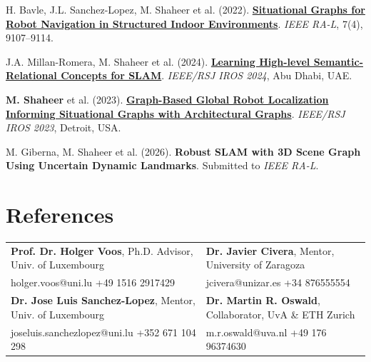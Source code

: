 \documentclass[a4paper,11pt]{article}
\begin{document}
{\begin{enumerate}[leftmargin=*, labelsep=0.5em, align=left, widest={[\textbf{S.1}]}, itemindent=0em, itemsep=0mm]
\item[\textbf{[J.8]}] H. Bavle, J.L. Sanchez-Lopez, M. Shaheer et al. (2022). \href{https://ieeexplore.ieee.org/document/9826367}{\textbf{Situational Graphs for Robot Navigation in Structured Indoor Environments}}. \textit{IEEE RA-L}, 7(4), 9107--9114.

\item[\textbf{[C.1]}] J.A. Millan-Romera, M. Shaheer et al. (2024). \href{https://ieeexplore.ieee.org/document/10801511}{\textbf{Learning High-level Semantic-Relational Concepts for SLAM}}. \textit{IEEE/RSJ IROS 2024}, Abu Dhabi, UAE.

\item[\textbf{[C.2]}] \textbf{M. Shaheer} et al. (2023). \href{https://ieeexplore.ieee.org/document/10341373}{\textbf{Graph-Based Global Robot Localization Informing Situational Graphs with Architectural Graphs}}. \textit{IEEE/RSJ IROS 2023}, Detroit, USA.

\item[\textbf{[S.1]}] M. Giberna, M. Shaheer et al. (2026). \textbf{Robust SLAM with 3D Scene Graph Using Uncertain Dynamic Landmarks}. Submitted to \textit{IEEE RA-L}.
\end{enumerate}
}
\vspace{-2mm}

\section{\textbf{References}}
\vspace{1mm}
\footnotesize{
\begin{tabularx}{\textwidth}{@{}L@{\hspace{5mm}}L@{}}
\textbf{Prof. Dr. Holger Voos}, Ph.D. Advisor, Univ. of Luxembourg & \textbf{Dr. Javier Civera}, Mentor, University of Zaragoza \\
holger.voos@uni.lu \textbar{} +49 1516 2917429 & jcivera@unizar.es \textbar{} +34 876555554 \\[1mm]
\textbf{Dr. Jose Luis Sanchez-Lopez}, Mentor, Univ. of Luxembourg & \textbf{Dr. Martin R. Oswald}, Collaborator, UvA \& ETH Zurich \\
joseluis.sanchezlopez@uni.lu \textbar{} +352 671 104 298 & m.r.oswald@uva.nl \textbar{} +49 176 96374630 \\
\end{tabularx}
}
\end{document}
